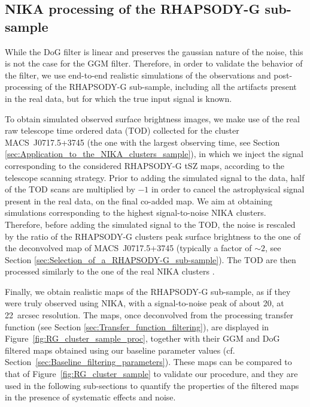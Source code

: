 \documentclass[twocolumn,traditabstract]{aa}
\begin{document}
\subsection{NIKA processing of the RHAPSODY-G sub-sample}
While the DoG filter is linear and preserves the gaussian nature of the noise, this is not the case for the GGM filter. Therefore, in order to validate the behavior of the filter, we use end-to-end realistic simulations of the observations and post-processing of the RHAPSODY-G sub-sample, including all the artifacts present in the real data, but for which the true input signal is known.

To obtain simulated observed surface brightness images, we make use of the real raw telescope time ordered data (TOD) collected for the cluster \mbox{MACS~J0717.5+3745} (the one with the largest observing time, see Section \ref{sec:Application_to_the_NIKA_clusters_sample}), in which we inject the signal corresponding to the considered RHAPSODY-G tSZ maps, according to the telescope scanning strategy. Prior to adding the simulated signal to the data, half of the TOD scans are multiplied by $-1$ in order to cancel the astrophysical signal present in the real data, on the final co-added map. We aim at obtaining simulations corresponding to the highest signal-to-noise NIKA clusters. Therefore, before adding the simulated signal to the TOD, the noise is rescaled by the ratio of the RHAPSODY-G clusters peak surface brightness to the one of the deconvolved map of \mbox{MACS~J0717.5+3745} (typically a factor of $\sim 2$, see Section \ref{sec:Selection_of_a_RHAPSODY-G_sub-sample}). The TOD are then processed similarly to the one of the real NIKA clusters \citep[see][for more details]{Adam2015}. 

Finally, we obtain realistic maps of the RHAPSODY-G sub-sample, as if they were truly observed using NIKA, with a signal-to-noise peak of about 20, at 22~arcsec resolution. The maps, once deconvolved from the processing transfer function (see Section \ref{sec:Transfer_function_filtering}), are displayed in Figure~\ref{fig:RG_cluster_sample_proc}, together with their GGM and DoG filtered maps obtained using our baseline parameter values (cf. Section~\ref{sec:Baseline_filtering_parameters}). These maps can be compared to that of Figure~\ref{fig:RG_cluster_sample} to validate our procedure, and they are used in the following sub-sections to quantify the properties of the filtered maps in the presence of systematic effects and noise.
\end{document}
